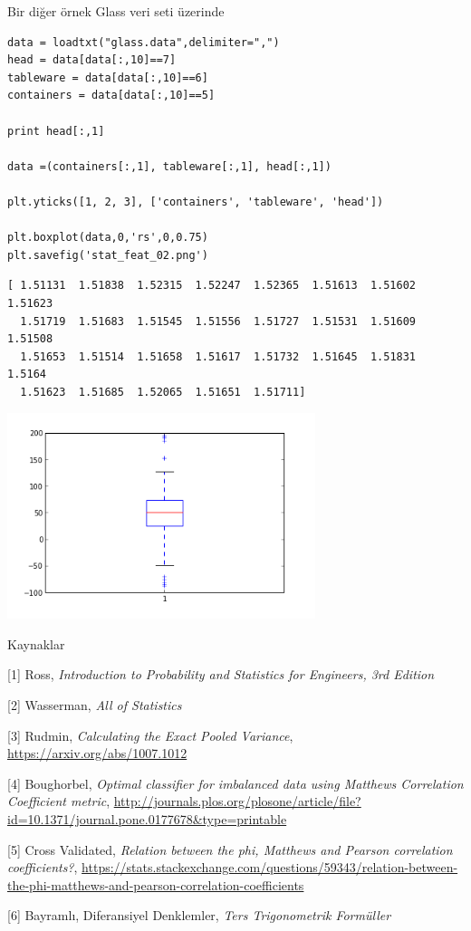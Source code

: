 \documentclass[12pt,fleqn]{article}\usepackage{../../common}
\begin{document}
Bir diğer örnek Glass veri seti üzerinde

\begin{verbatim}
data = loadtxt("glass.data",delimiter=",")
head = data[data[:,10]==7]
tableware = data[data[:,10]==6]
containers = data[data[:,10]==5]

print head[:,1]

data =(containers[:,1], tableware[:,1], head[:,1])

plt.yticks([1, 2, 3], ['containers', 'tableware', 'head'])

plt.boxplot(data,0,'rs',0,0.75)
plt.savefig('stat_feat_02.png')
\end{verbatim}

\begin{verbatim}
[ 1.51131  1.51838  1.52315  1.52247  1.52365  1.51613  1.51602  1.51623
  1.51719  1.51683  1.51545  1.51556  1.51727  1.51531  1.51609  1.51508
  1.51653  1.51514  1.51658  1.51617  1.51732  1.51645  1.51831  1.5164
  1.51623  1.51685  1.52065  1.51651  1.51711]
\end{verbatim}

\includegraphics[height=6cm]{stat_feat_02.png}

Kaynaklar

[1] Ross, {\em Introduction to Probability and Statistics for Engineers, 3rd Edition}

[2] Wasserman, {\em All of Statistics}

[3] Rudmin, {\em Calculating the Exact Pooled Variance},
    \url{https://arxiv.org/abs/1007.1012}

[4] Boughorbel, {\em Optimal classifier for imbalanced data using Matthews Correlation Coefficient metric}, \url{http://journals.plos.org/plosone/article/file?id=10.1371/journal.pone.0177678&type=printable}

[5] Cross Validated, {\em Relation between the phi, Matthews and Pearson correlation coefficients?}, \url{https://stats.stackexchange.com/questions/59343/relation-between-the-phi-matthews-and-pearson-correlation-coefficients}

[6] Bayramlı, Diferansiyel Denklemler, {\em Ters Trigonometrik Formüller}
\end{document}
